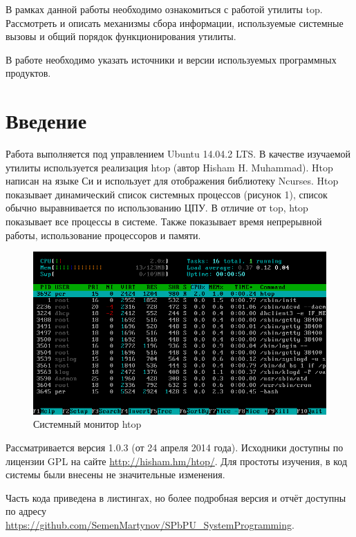 \documentclass[a4paper, 12pt]{article}		%
\begin{document}
В рамках данной работы необходимо ознакомиться с работой утилиты top. Рассмотреть и описать механизмы сбора информации, используемые системные вызовы и общий порядок функционирования утилиты.
\vspace{3em}

В работе необходимо указать источники и версии используемых программных продуктов.


\newpage
\section*{Введение}

Работа выполняется под управлением Ubuntu 14.04.2 LTS. В качестве изучаемой утилиты используется реализация htop (автор Hisham H. Muhammad). Htop написан на языке Си и использует для отображения библиотеку Ncurses. Htop показывает динамический список системных процессов (рисунок 1), список обычно выравнивается по использованию ЦПУ. В отличие от top, htop показывает все процессы в системе. Также показывает время непрерывной работы, использование процессоров и памяти.

\begin{figure}[h!]
\centering
\includegraphics[scale=0.65]{res/Htop}
\caption{Системный монитор htop}
\end{figure}

Рассматривается версия 1.0.3 (от 24 апреля 2014 года). Исходники доступны по лицензии GPL на сайте \url{http://hisham.hm/htop/}. Для простоты изучения, в код системы были внесены не значительные изменения.

Часть кода приведена в листингах, но более подробная версия и отчёт доступны по адресу \\ \url{https://github.com/SemenMartynov/SPbPU_SystemProgramming}.
\end{document}
